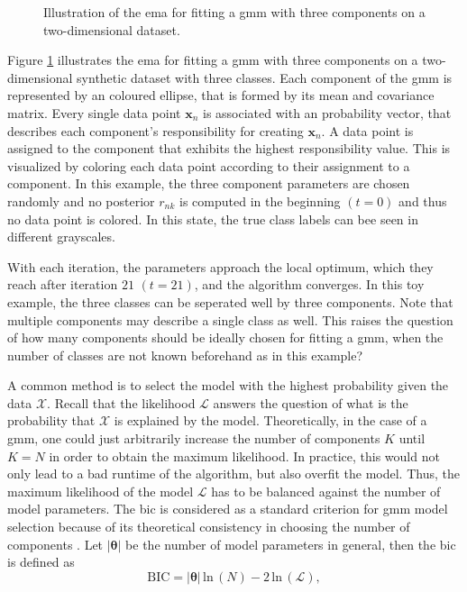 \documentclass[../../../main.tex]{subfiles}
\begin{document}
 \begin{figure}[b!]
    \centering
    
    \caption[Illustration of the \gls{ema}]{Illustration of the \gls{ema} for fitting a \gls{gmm} with three components on a two-dimensional dataset.}
    \label{fig:em_algo_gmm}
\end{figure}

Figure \ref{fig:em_algo_gmm} illustrates the \gls{ema} for fitting a \gls{gmm} with three components on a two-dimensional synthetic dataset with three classes. Each component of the \gls{gmm} is represented by an coloured ellipse, that is formed by its mean and covariance matrix. Every single data point $\bm{x}_n$ is associated with an probability vector, that describes each component's responsibility for creating $\bm{x}_n$. A data point is assigned to the component that exhibits the highest responsibility value. This is visualized by coloring each data point according to their assignment to a component. In this example, the three component parameters are chosen randomly and no posterior $r_{nk}$ is computed in the beginning $(t=0)$ and thus no data point is colored. In this state, the true class labels can bee seen in different grayscales. 

With each iteration, the parameters approach the local optimum, which they reach after iteration $21$ $(t=21)$, and the algorithm converges. In this toy example, the three classes can be seperated well by three components. Note that multiple components may describe a single class as well. This raises the question of how many components should be ideally chosen for fitting a \gls{gmm}, when the number of classes are not known beforehand as in this example? 

A common method is to select the model with the highest probability given the data $\mathcal{X}$. Recall that the likelihood $\mathcal{L}$ answers the question of what is the probability that $\mathcal{X}$ is explained by the model. Theoretically, in the case of a \gls{gmm}, one could just arbitrarily increase the number of components $K$ until $K = N$ in order to obtain the maximum likelihood. In practice, this would not only lead to a bad runtime of the algorithm, but also overfit the model. Thus, the maximum likelihood of the model $\mathcal{L}$ has to be balanced against the number of model parameters. The \gls{bic} is considered as a standard criterion for \gls{gmm} model selection because of its theoretical consistency in choosing the number of components \cite{keribin2000consistent}. Let $|\bm{\theta}|$ be the number of model parameters in general, then the \gls{bic} is defined as
\begin{equation}
    \text{BIC} = |\bm{\theta}| \, \text{ln} \, (N) - 2 \, \text{ln} \, (\mathcal{L}),
\end{equation}
\end{document}
